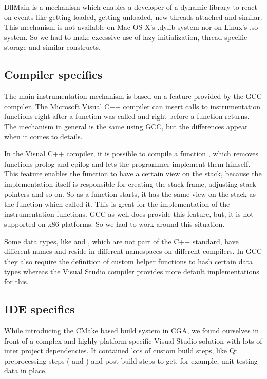 DllMain is a mechanism which enables a developer of a dynamic library to react on events like getting loaded, getting unloaded, new threads attached and similar. This mechanism is not available on Mac OS X's .dylib system nor on Linux's .so system. So we had to make excessive use of lazy initialization, thread specific storage and similar constructs.

\subsection{Compiler specifics}

The main instrumentation mechanism is based on a feature provided by the GCC compiler.  The Microsoft Visual C++ compiler can insert calls to instrumentation functions right after a function was called and right before a function returns. The mechanism in general is the same using GCC, but the differences appear when it comes to details.

In the Visual C++ compiler, it is possible to compile a function , which removes functions prolog and epilog and lets the programmer implement them himself. This feature enables the function to have a certain view on the stack, because the implementation itself is responsible for creating the stack frame, adjusting stack pointers and so on. So as a  function starts, it has the same view on the stack as the function which called it. This is great for the implementation of the instrumentation functions. GCC as well does provide this feature, but, it is not supported on x86 platforms. So we had to work around this situation.

Some data types, like  and , which are not part of the C++ standard, have different names and reside in different namespaces on different compilers.  In GCC they also require the definition of custom helper functions to hash certain data types whereas the Visual Studio compiler provides more default implementations for this.

\subsection{IDE specifics}

While introducing the CMake based build system in CGA, we found ourselves in front of a complex and highly platform specific Visual Studio solution with lots of inter project dependencies. It contained lots of custom build steps, like Qt preprocessing steps ( and ) and post build steps to get, for example, unit testing data in place.

